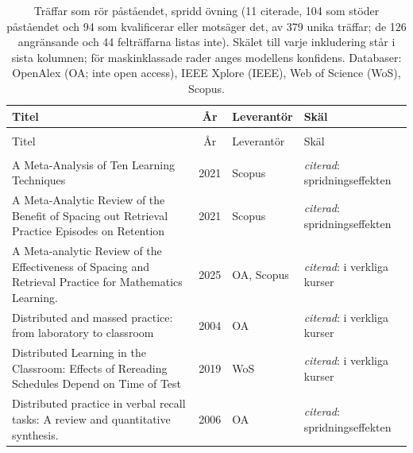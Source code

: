 
\begingroup\footnotesize
\begin{longtable}{@{}%
  >{\raggedright\arraybackslash}p{}c%
  >{\raggedright\arraybackslash}p{}%
  >{\raggedright\arraybackslash}p{}@{}}
\caption{Träffar som rör påståendet, spridd övning (11 citerade, 104 som stöder påståendet och 94 som kvalificerar eller motsäger det, av 379 unika träffar; de 126 angränsande och 44 felträffarna listas inte). Skälet till varje inkludering står i sista kolumnen; för maskinklassade rader anges modellens konfidens. Databaser: OpenAlex (OA; inte open access), IEEE Xplore (IEEE), Web of Science (WoS), Scopus.}\label{tab:sok-recap-spacing}\\
\toprule
Titel & År & Leverantör & Skäl \\
\midrule
\endfirsthead
\multicolumn{4}{@{}l}{\emph{\tablename~\thetable{} (forts.)}}\\
\toprule
Titel & År & Leverantör & Skäl \\
\midrule
\endhead
\midrule \multicolumn{4}{r@{}}{\emph{forts.\ på nästa sida}}\\
\endfoot
\bottomrule
\endlastfoot
A Meta-Analysis of Ten Learning Techniques & 2021 & Scopus & \emph{citerad}: spridningseffekten \\
A Meta-Analytic Review of the Benefit of Spacing out Retrieval Practice Episodes on Retention & 2021 & Scopus & \emph{citerad}: spridningseffekten \\
A Meta-analytic Review of the Effectiveness of Spacing and Retrieval Practice for Mathematics Learning. & 2025 & OA, Scopus & \emph{citerad}: i verkliga kurser \\
Distributed and massed practice: from laboratory to classroom & 2004 & OA & \emph{citerad}: i verkliga kurser \\
Distributed Learning in the Classroom: Effects of Rereading Schedules Depend on Time of Test & 2019 & WoS & \emph{citerad}: i verkliga kurser \\
Distributed practice in verbal recall tasks: A review and quantitative synthesis. & 2006 & OA & \emph{citerad}: spridningseffekten \\

\end{longtable}
